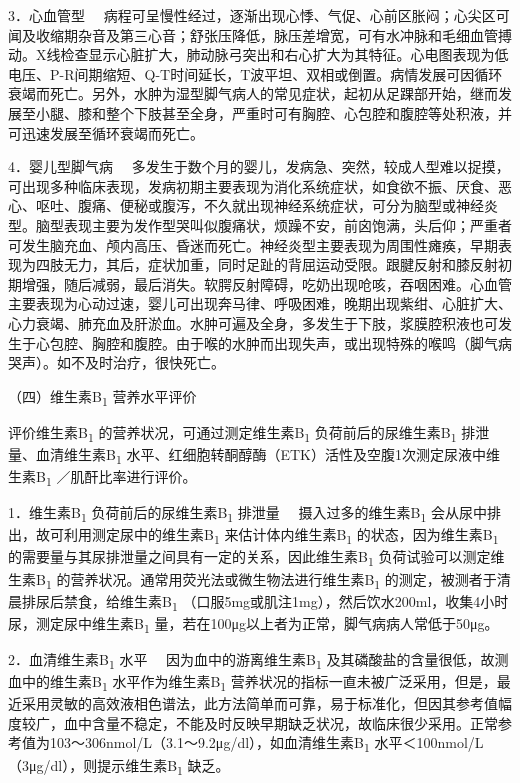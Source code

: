 {3．心血管型}
　病程可呈慢性经过，逐渐出现心悸、气促、心前区胀闷；心尖区可闻及收缩期杂音及第三心音；舒张压降低，脉压差增宽，可有水冲脉和毛细血管搏动。X线检查显示心脏扩大，肺动脉弓突出和右心扩大为其特征。心电图表现为低电压、P-R间期缩短、Q-T时间延长，T波平坦、双相或倒置。病情发展可因循环衰竭而死亡。另外，水肿为湿型脚气病人的常见症状，起初从足踝部开始，继而发展至小腿、膝和整个下肢甚至全身，严重时可有胸腔、心包腔和腹腔等处积液，并可迅速发展至循环衰竭而死亡。

{4．婴儿型脚气病}
　多发生于数个月的婴儿，发病急、突然，较成人型难以捉摸，可出现多种临床表现，发病初期主要表现为消化系统症状，如食欲不振、厌食、恶心、呕吐、腹痛、便秘或腹泻，不久就出现神经系统症状，可分为脑型或神经炎型。脑型表现主要为发作型哭叫似腹痛状，烦躁不安，前囟饱满，头后仰；严重者可发生脑充血、颅内高压、昏迷而死亡。神经炎型主要表现为周围性瘫痪，早期表现为四肢无力，其后，症状加重，同时足趾的背屈运动受限。跟腱反射和膝反射初期增强，随后减弱，最后消失。软腭反射障碍，吃奶出现呛咳，吞咽困难。心血管主要表现为心动过速，婴儿可出现奔马律、呼吸困难，晚期出现紫绀、心脏扩大、心力衰竭、肺充血及肝淤血。水肿可遍及全身，多发生于下肢，浆膜腔积液也可发生于心包腔、胸腔和腹腔。由于喉的水肿而出现失声，或出现特殊的喉鸣（脚气病哭声）。如不及时治疗，很快死亡。

（四）维生素B\textsubscript{1} 营养水平评价

评价维生素B\textsubscript{1}
的营养状况，可通过测定维生素B\textsubscript{1}
负荷前后的尿维生素B\textsubscript{1}
排泄量、血清维生素B\textsubscript{1}
水平、红细胞转酮醇酶（ETK）活性及空腹1次测定尿液中维生素B\textsubscript{1}
／肌酐比率进行评价。

{1．维生素B\textsubscript{1} 负荷前后的尿维生素B\textsubscript{1}
排泄量} 　摄入过多的维生素B\textsubscript{1}
会从尿中排出，故可利用测定尿中的维生素B\textsubscript{1}
来估计体内维生素B\textsubscript{1} 的状态，因为维生素B\textsubscript{1}
的需要量与其尿排泄量之间具有一定的关系，因此维生素B\textsubscript{1}
负荷试验可以测定维生素B\textsubscript{1}
的营养状况。通常用荧光法或微生物法进行维生素B\textsubscript{1}
的测定，被测者于清晨排尿后禁食，给维生素B\textsubscript{1}
（口服5mg或肌注1mg），然后饮水200ml，收集4小时尿，测定尿中维生素B\textsubscript{1}
量，若在100μg以上者为正常，脚气病病人常低于50μg。

{2．血清维生素B\textsubscript{1} 水平}
　因为血中的游离维生素B\textsubscript{1}
及其磷酸盐的含量很低，故测血中的维生素B\textsubscript{1}
水平作为维生素B\textsubscript{1}
营养状况的指标一直未被广泛采用，但是，最近采用灵敏的高效液相色谱法，此方法简单而可靠，易于标准化，但因其参考值幅度较广，血中含量不稳定，不能及时反映早期缺乏状况，故临床很少采用。正常参考值为103～306nmol/L（3.1～9.2μg/dl），如血清维生素B\textsubscript{1}
水平＜100nmol/L（3μg/dl），则提示维生素B\textsubscript{1} 缺乏。

